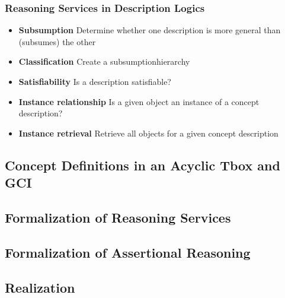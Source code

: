 \documentclass[conference, a4paper]{styles/acmsiggraph}
\begin{document}
        \subsubsection{Reasoning Services in Description Logics}
            \begin{itemize}
                \item \textbf{Subsumption}\newline
                    Determine whether one description is more general than (subsumes) the other
                \item \textbf{Classification}\newline
                    Create a subsumptionhierarchy
                \item \textbf{Satisfiability}\newline
                    Is a description satisfiable?
                \item \textbf{Instance relationship}\newline
                    Is a given object an instance of a concept description?
                \item \textbf{Instance retrieval}\newline
                    Retrieve all objects for a given concept description
            \end{itemize}
    
    \subsection{Concept Definitions in an Acyclic Tbox and GCI}
    \subsection{Formalization of Reasoning Services}
    \subsection{Formalization of Assertional Reasoning}
    \subsection{Realization}
        
    
    
    
    
    
    
\end{document}
